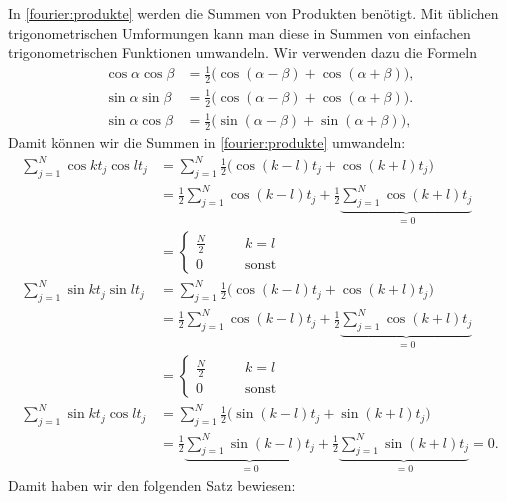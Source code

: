 In \eqref{fourier:produkte} werden die Summen von Produkten benötigt.
Mit üblichen trigonometrischen Umformungen kann man diese in Summen
von einfachen trigonometrischen Funktionen umwandeln.
Wir verwenden dazu die Formeln
\begin{align}
\cos\alpha\cos\beta
&=
\frac12\bigl(\cos(\alpha-\beta)+\cos(\alpha+\beta)\bigr),
\label{fourier:coscos}
\\
\sin\alpha\sin\beta
&=
\frac12\bigl(\cos(\alpha-\beta) + \cos(\alpha+\beta)\bigr).
\label{fourier:sinsin}
\\
\sin\alpha\cos\beta
&=
\frac12\bigl(\sin(\alpha-\beta) + \sin(\alpha+\beta)\bigr),
\label{fourier:sincos}
\end{align}
Damit können wir die Summen in \eqref{fourier:produkte} umwandeln:
\begin{align*}
\sum_{j=1}^N \cos kt_j\cos lt_j
&=
\sum_{j=1}^N \frac12\bigl(\cos (k-l)t_j +\cos(k+l)t_j\bigr)
\\
&=
\frac12\sum_{j=1}^N \cos (k-l)t_j
+ \frac12\underbrace{\sum_{j=1}^N\cos(k+l)t_j}_{\displaystyle=0}
\\
&=
\begin{cases}
\displaystyle\frac{N}2&\qquad k=l\\
0&\qquad\text{sonst}
\end{cases}
\\
\sum_{j=1}^N \sin kt_j \sin lt_j
&=
\sum_{j=1}^N \frac12\bigl(\cos(k-l)t_j +\cos(k+l)t_j\bigr)
\\
&=\frac12\sum_{j=1}^N \cos(k-l)t_j
+\frac12\underbrace{\sum_{j=1}^N \cos(k+l)t_j}_{\displaystyle=0}
\\
&=
\begin{cases}
\displaystyle\frac{N}2&\qquad k=l\\
0&\qquad\text{sonst}
\end{cases}
\\
\sum_{j=1}^N \sin kt_j \cos lt_j
&=
\sum_{j=1}^N \frac12\bigl(\sin(k-l)t_j +\sin(k+l)t_j\bigr)
\\
&=
\frac12\underbrace{\sum_{j=1}^N \sin(k-l)t_j}_{\displaystyle=0}
+
\frac12\underbrace{\sum_{j=1}^N \sin(k+l)t_j}_{\displaystyle=0}
=0.
\end{align*}
Damit haben wir den folgenden Satz bewiesen:

